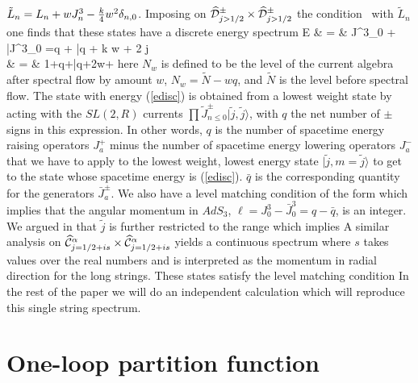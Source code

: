 $\tilde{L}_n = L_n + wJ^3_n -{k \over 4}w^2 \delta _{n,0}$.  Imposing on 
$\widehat{{\cal D}} ^{\pm}_{j >1/2} \times \widehat{{\cal D}}^{\pm}_{j >1/2}$ 
the condition \Vir \ with $\tilde{L}_n$ one 
finds that these states have a discrete energy spectrum 
\ber \label{edisc}
E & = & J^3_0 + {\bar J}^3_0 =q + \bar q + k w + 2 \tilde j  
\nonumber \\
& = & 1+q+\bar{q}+2w+
\eer
here $N_w$ is defined to be the level of the current algebra after spectral
flow by amount $w$, $N_w = \tilde N - wq$, and $\tilde N$ is the level
before
spectral flow. The state with energy (\ref{edisc}) is obtained
from a lowest weight state by acting with the $SL(2,R)$ currents
$\prod {\tilde J}^\pm_{n\leq 0} | \tilde{j},\tilde{j}\rangle $,
with $q$ the net number
of $\pm$ signs in this expression. In other words, $q$ is the 
number of spacetime energy raising operators $J^+_a$ minus the 
number of spacetime energy lowering operators $J^-_a$ that we
have to apply to the lowest weight, lowest energy state $ |\tilde{j}, 
m = \tilde{j} \rangle$
to get to the state whose spacetime energy is (\ref{edisc}). 
$\bar q$ is the corresponding quantity for the generators $\bar J^\pm_a$. 
We also have a level matching condition of the form 
which implies that the angular momentum in $AdS_3$, $\ell = 
J^3_0 - \bar J^3_0 = q -\bar q $, is an integer.
  We argued in \cite{Maldacena:2000hw} that 
$\tilde j$ is further restricted to the range 
 which implies
A similar analysis on 
$\widehat{{\cal C}}^{\alpha}_{j=1/2 + is} 
\times \widehat{{\cal C}}^{\alpha}_{j=1/2 + is}$ 
yields a continuous spectrum 
where $s$ takes values over the real numbers and is interpreted as the 
momentum in radial direction for the long strings. 
These states satisfy the level matching condition 
In the rest of the paper we will do an independent calculation 
which will reproduce this single string spectrum. 

\section{One-loop partition function}
\label{oneloop}

